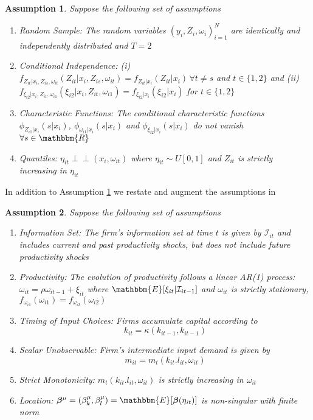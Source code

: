 \documentclass[11pt]{article}
\newtheorem{assump}{Assumption}[section]
\newcommand{\indep}{\perp \!\!\! \perp}
\begin{document}
\begin{assump} \label{idpart1}
Suppose the following set of assumptions 
	\begin{enumerate}[label=(\alph*)]
		\item Random Sample: The random variables $(y_{i}, Z_{i}, \omega_{i})_{i=1}^{N}$ are identically and independently distributed and $T=2$
		\item Conditional Independence: (i) $f_{Z_{it}|x_{i}, Z_{is}, \omega_{it}}(Z_{it}|x_{i}, Z_{is}, \omega_{it})=f_{Z_{it}|x_{i}}(Z_{it}|x_{i})\, \forall t\neq s$ and $t\in\{1,2\}$ and (ii) $f_{\xi_{i2}|x_{i}, Z_{it}, \omega_{i1}}(\xi_{i2}|x_{i}, Z_{it}, \omega_{i1})=f_{\xi_{i2}|x_{i}}(\xi_{i2}|x_{i})$ for $t\in\{1,2\}$
		\item Characteristic Functions: The conditional characteristic functions $\phi_{Z_{i1}|x_{i}}(s|x_{i})$, $\phi_{\omega_{i1}|x_{i}}(s|x_{i})$ and $\phi_{\xi_{i2}|x_{i}}(s|x_{i})$  do not vanish $\forall s\in \mathbbm{R}$
		\item Quantiles: $\eta_{it}\indep (x_{i}, \omega_{it})$ where $\eta_{it}\sim U[0,1]$ and $Z_{it}$ is strictly increasing in $\eta_{it}$
	\end{enumerate}
\end{assump}
In addition to Assumption \ref{idpart1} we restate and augment the assumptions in \cite{Ackerberg2015}
\begin{assump} \label{idpart2}
Suppose the following set of assumptions 
	\begin{enumerate}[label=(\alph*)]
		\item Information Set: The firm's information set at time $t$ is given by $\mathcal{I}_{it}$ and includes current and past productivity shocks, but does not include future productivity shocks
		\item Productivity: The evolution of productivity follows a linear AR(1) process: $\omega_{it}=\rho\omega_{it-1}+\xi_{it}$ where $\mathbbm{E}[\xi_{it}|\mathcal{I}_{it-1}]$ and $\omega_{it}$ is strictly stationary, $f_{\omega_{i1}}(\omega_{i1})=f_{\omega_{i2}}(\omega_{i2})$
		\item Timing of  Input Choices: Firms accumulate capital according to
		\begin{equation*}
		k_{it}=\kappa(k_{it-1}, k_{it-1})
		\end{equation*}
		\item Scalar Unobservable: Firm's intermediate input demand is given by
		\begin{equation*}
		m_{it}=m_{t}(k_{it}. l_{it}, \omega_{it})
		\end{equation*}
		\item Strict Monotonicity: $m_{t}(k_{it}. l_{it}, \omega_{it})$ is strictly increasing in $\omega_{it}$
		\item Location: $\boldsymbol{\beta}^{\mu}=(\beta_{k}^{\mu}, \beta_{l}^{\mu})=\mathbbm{E}[\boldsymbol{\beta}(\eta_{it})]$ is non-singular with finite norm
	\end{enumerate}
\end{assump}
\end{document}
